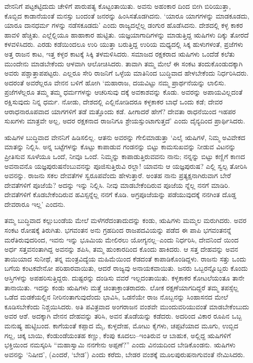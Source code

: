 ವೇನನಿಗೆ ಪಟ್ಟಕಟ್ಟಿದುದು ಚೇಳಿಗೆ ಪಾರುಪತ್ಯ ಕೊಟ್ಟಂತಾಯಿತು. ಅವನು ಅಹಂಕಾರ ದಿಂದ ಬೀಗಿ ಬಿರಿಯುತ್ತಾ, ಕೊಬ್ಬಿದ ಕಾಡಾನೆಯಂತೆ ಮನಸ್ಸು ಬಂದಂತೆ ಜನರನ್ನು ಹಿಂಸಿಸತೊಡಗಿದನು. ‘ಯಾರೂ ಯಾಗಗಳನ್ನು ಮಾಡಕೂಡದು, ಯಾರೂ ದಾನಧರ್ಮ ಗಳನ್ನು ನಡೆಸಕೂಡದು’ ಎಂದು ರಾಜ್ಯದಲ್ಲೆಲ್ಲ ಡಂಗುರ ಹೊಡೆಸಿದನು. ದೇಶದಲ್ಲಿ ಕಳ್ಳ ಕಾಕರ ಹಾವಳಿ ಹೆಚ್ಚಿತು. ಎಲ್ಲೆಲ್ಲಿಯೂ ಹಾಹಾಕಾರ ಹುಟ್ಟಿತು. ಯಜ್ಞಯಾಗಾದಿಗಳನ್ನು ಮಾಡುತ್ತಿದ್ದ ಋಷಿಗಳು ದಿಕ್ಕು ತೋರದೆ ಕಳವಳಿಸಿದರು. ಎರಡು ಕಡೆಯಿಂದಲೂ ಉರಿ ಯುತ್ತಾ ಬರುತ್ತಿದ್ದ ಉರಿಯ ಮಧ್ಯದಲ್ಲಿ ಸಿಕ್ಕ ಹುಳುಗಳಂತೆ, ಪ್ರಜೆಗಳು ಅತ್ತ ರಾಜನ ಕಾಟ, ಇತ್ತ ಕಳ್ಳರ ಕಾಟಕ್ಕೆ ಸಿಕ್ಕಿ ತಳಮಳಿಸಿದರು. ಸಮಾಜದ ರಕ್ಷಕರಾದ ಋಷಿಗಳು ಒಂದೆಡೆ ಕಲೆತು ಮುಂದೇನು ಮಾಡಬೇಕೆಂದು ಆಳವಾಗಿ ಆಲೋಚಿಸಿದರು. ತಾವಾಗಿ ತಮ್ಮ ಮೇಲೆ ಈ ಸಂಕಟ ತಂದುಕೊಂಡುದಕ್ಕಾಗಿ ಅವರು ಪಶ್ಚಾತ್ತಾಪಪಟ್ಟರು. ಎಲ್ಲರೂ ಸೇರಿ ರಾಜನಿಗೆ ಒಳ್ಳೆಯ ಮಾತಿನಿಂದ ಬುದ್ಧಿವಾದ ಹೇಳಬೇಕೆಂದು ನಿರ್ಧರಿಸಿದರು. ಅದರಂತೆ ಅವರೆಲ್ಲರೂ ವೇನನ ಬಳಿಗೆ ಹೋಗಿ ‘ಮಹಾರಾಜ, ದಯವಿಟ್ಟು ನಮ್ಮ ಪ್ರಾರ್ಥನೆಯನ್ನು ಲಾಲಿಸು. ಪ್ರಜೆಗಳೆಲ್ಲರೂ ತಮ್ಮ ತಮ್ಮ ಧರ್ಮಗಳನ್ನು ಆಚರಿಸುವು ದಕ್ಕೆ ಅವಕಾಶವನ್ನು ಕೊಡು. ಅವರನ್ನು ಅಪಾಯವಿಲ್ಲದಂತೆ ರಕ್ಷಿಸುವುದು ನಿನ್ನ ಧರ್ಮ. ನೋಡು, ದೇಶದಲ್ಲಿ ಎಲ್ಲಿನೋಡಿದರೂ ಕಳ್ಳಕಾಕರ ಬಾಧೆ ಒಂದು ಕಡೆ; ದೇವರ ಆರಾಧನಾರೂಪವಾದ ಯಾಗಗಳಿಗೆ ತಡೆ ಮತ್ತೊಂದು ಕಡೆ. ಹೀಗಾದರೆ ಹೇಗೆ? ದೇವತಾ ರಾಧನೆಯಿಂದ ಇಹಪರ ಸುಖಗಳು ಮಾತ್ರವೇ ಅಲ್ಲ, ಅದರ ರಕ್ಷಕನಾದ ರಾಜನಿಗೂ ಶ್ರೇಯಸ್ಸುಂಟಾಗುತ್ತದೆ’ ಎಂದು ದೈನ್ಯದಿಂದ ಪ್ರಾರ್ಥಿಸಿದರು.

ಋಷಿಗಳ ಬುದ್ಧಿವಾದ ವೇನನಿಗೆ ಹಿಡಿಸಲಿಲ್ಲ. ಆತನು ಅವರನ್ನು ಗೇಲಿಮಾಡುತ್ತಾ ‘ಎಲೈ ಋಷಿಗಳೆ, ನಿಮ್ಮ ಅವಿವೇಕದ ಮಾತನ್ನು ನಿಲ್ಲಿಸಿ. ಅನ್ನ ಬಟ್ಟೆಗಳನ್ನು ಕೊಟ್ಟು ಕಾಪಾಡುವ ಗಂಡನನ್ನು ಬಿಟ್ಟು ಕಾಮಸುಖವನ್ನು ನೀಡುವ ವಿಟನನ್ನು ಪ್ರೀತಿಸುವ ಸೂಳೆಯೂ ಒಂದೆ, ನೀವೂ ಒಂದೆ. ನಿಮ್ಮನ್ನು ಕಾಪಾಡುತ್ತಿರುವವನು ನಾನು; ನನ್ನನ್ನು ಬಿಟ್ಟು ಕಣ್ಣಿಗೆ ಕಾಣದ ಅವನಾವನೊ ಯಜ್ಞಪುರುಷನೆಂಬುವನನ್ನು ಪೂಜಿಸುತ್ತಿರುವಿ ರಲ್ಲಾ! ಯಾವನು ಆ ಯಜ್ಞಪುರುಷ? ಎಲ್ಲಿ ಸ್ವಲ್ಪ ತೋರಿಸಿ ಅವನನ್ನು. ರಾಜನು ಸಕಲ ದೇವತೆಗಳ ಸ್ವರೂಪವೆಂದು ಹೇಳುತ್ತಾರೆ. ಅಂತಹ ನಾನು ಪ್ರತ್ಯಕ್ಷನಾಗಿರುವಾಗ ಬೇರೆ ದೇವತೆಗಳಿಗೆ ಪೂಜೆಯೆ? ಅದನ್ನು ಇನ್ನು ನಿಲ್ಲಿಸಿ. ನೀವು ಮಾಡಬೇಕೆಂದಿರುವ ಪೂಜೆಯ ನ್ನೆಲ್ಲ ನನಗೆ ಮಾಡಿರಿ. ದೇವತೆಗಳಿಗೆ ಕೊಡಬೇಕೆಂದಿರುವ ಹವಿಸ್ಸನ್ನೆಲ್ಲ ನನಗೆ ಕೊಡಿ. ಅಗ್ರಪೂಜೆಯನ್ನು ಪಡೆಯುವುದಕ್ಕೆ ನನಗಿಂತ ದೊಡ್ಡ ದೇವರಾರೂ ಇಲ್ಲ’ ಎಂದನು.

ತಮ್ಮ ಬುದ್ಧಿವಾದ ಕಲ್ಲುಬಂಡೆಯ ಮೇಲೆ ಮಳೆಗರೆದಂತಾದುದನ್ನು ಕಂಡು, ಋಷಿಗಳು ಮಮ್ಮಲ ಮರುಗಿದರು. ಅವರ ಸಂಕಟ ರೋಷಕ್ಕೆ ತಿರುಗಿತು. ಭಗವಂತನ ಅನು ಗ್ರಹದಿಂದ ರಾಜಪದವಿಯನ್ನು ಪಡೆದ ಈ ಪಾಪಿ ಭಗವಂತನನ್ನೆ ಮರೆತಿರುವುದರಿಂದ, ಇವನು ಇನ್ನು ಭೂಮಿಯ ಮೇಲಿರಲು ಯೋಗ್ಯನಲ್ಲ–ಎಂದು ನಿರ್ಧರಿಸಿ, ದೇವನಿಂದೆ ಯಿಂದ ಅರ್ಧ ಸತ್ತವನಂತಾಗಿದ್ದ ಅವನನ್ನು ಶಪಿಸಿ, ತಮ್ಮ ಹುಂಕಾರದಿಂದ ಕೊಂದು ಹಾಕಿದರು. ಆ ಸತ್ತ ದೇಹವನ್ನು ಅವನ ತಾಯಿಯಾದ ಸುನೀಥೆ, ತನ್ನ ಮಂತ್ರವಿದ್ಯೆಯ ಮಹಿಮೆಯಿಂದ ಕೆಡದಂತೆ ಕಾಪಾಡಿಕೊಂಡಿದ್ದಳು. ರಾಜನು ಸತ್ತು ಒಂದು ಬಗೆಯ ಕಂಟಕವೇನೋ ಪರಿಹಾರವಾಯಿತು, ಆದರೆ ರಾಜ್ಯವು ಅನಾಯಕವಾಯಿತು. ಜನರು ಒಬ್ಬರನ್ನೊಬ್ಬರು ಕೊಂದು ಆಸ್ತಿಗಳನ್ನು ಅಪಹರಿಸುತ್ತಿದ್ದರು. ದುಷ್ಟರನ್ನು ದಂಡಿಸು ವವರೆ ಇಲ್ಲದಂತಾಯಿತು. ಕಳ್ಳಕಾಕರ ಕೋಟಲೆಯಂತೂ ತಾನೇ ತಾನಾಯಿತು. ಇದನ್ನು ಕಂಡು ಋಷಿಗಳು ಮತ್ತೆ ಚಿಂತಾಕ್ರಾಂತರಾದರು. ಲೋಕ ರಕ್ಷಣೆಯಾಗದಿದ್ದರೆ ತಮ್ಮ ತಪಸ್ಸೆಲ್ಲ ಒಡೆದ ಮಡಕೆಯಲ್ಲಿನ ನೀರಿನಂತಾಗುವುದೆಂದು ಭಾವಿಸಿ, ಒಡನೆಯೇ ರಾಜ ನೊಬ್ಬನನ್ನು ಸಿಂಹಾಸನದ ಮೇಲೆ ಕೂಡಿಸಬೇಕೆಂದು ನಿಶ್ಚಯಿಸಿದರು. ಅತಿ ಪವಿತ್ರವಾದ ಅಂಗರಾಜನ ವಂಶವೇ ಮುಂದುವರಿಯುವಂತೆ ಮಾಡಬೇಕೆಂಬುದು ಅವರ ಆಶೆ. ಅದಕ್ಕಾಗಿ ವೇನನ ದೇಹವನ್ನು ತರಿಸಿ, ಅವನ ತೊಡೆಯನ್ನು ಕಡೆದರು. ಅದರಿಂದ ವಿಕಾರ ರೂಪಿನ ಒಬ್ಬ ಮನುಷ್ಯ ಹುಟ್ಟಿಬಂದ. ಕಾಗೆಯಂತೆ ಕಪ್ಪಾದ ಮೈ, ಕುಳ್ಳದೇಹ, ಮೋಟು ಕೈಗಳು, ಚಪ್ಪಟೆಯಾದ ಮೂಗು, ಉಬ್ಬಿದ ಗಲ್ಲ, ಚಿಕ್ಕ ಬಾಯಿ, ಕೆಂಡುಂಡೆಯಂತಹ ಕಣ್ಣು, ಕೆಂಪು ಕೂದಲು–ಇಂತಿರುವ ಆ ಬಾಹುಕ, ಅಲ್ಲಿದ್ದ ಋಷಿಗಳಿಗೆ ಭಕ್ತಿಯಿಂದ ನಮಸ್ಕರಿಸಿ “ಮಹಾಸ್ವಾಮಿ ನನಗೇನು ಅಪ್ಪಣೆ?” ಎಂದು ವಿನಯದಿಂದ ಬೇಡಿಕೊಂಡನು. ಋಷಿಗಳು ಅವನನ್ನು ‘ನಿಷೀದ’, (ಎಂದರೆ, ‘ಬೇಡ’) ಎಂದು ಕರೆದು, ಬೇಡರ ವಂಶಕ್ಕೆ ಮೂಲಪುರುಷನಾಗುವಂತೆ ನೇಮಿಸಿದರು.

